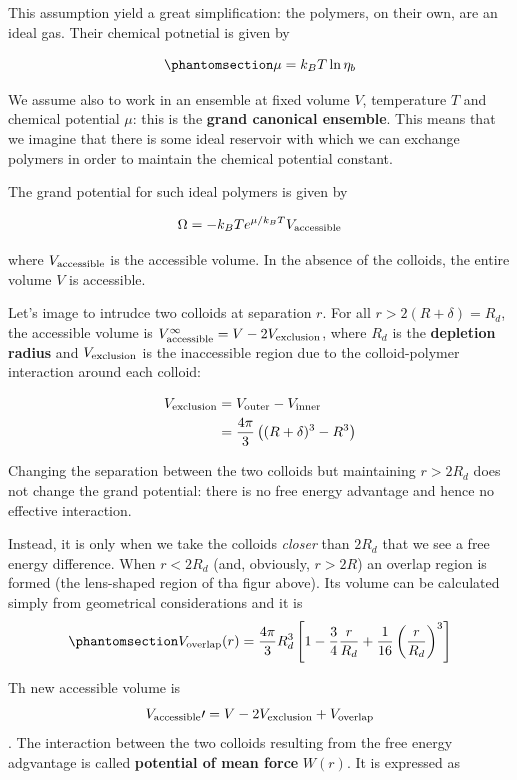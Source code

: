 \documentclass[
  letterpaper,
  enabledeprecatedfontcommands]{report}
\begin{document}
This assumption yield a great simplification: the polymers, on their
own, are an ideal gas. Their chemical potnetial is given by

\begin{equation}\phantomsection\label{eq-ideal-mu}{\mu = k_BT \ln \eta_b}\end{equation}

We assume also to work in an ensemble at fixed volume \(V\), temperature
\(T\) and chemical potential \(\mu\): this is the \textbf{grand
canonical ensemble}. This means that we imagine that there is some ideal
reservoir with which we can exchange polymers in order to maintain the
chemical potential constant.

The grand potential for such ideal polymers is given by

\[\Omega = -k_BT e^{\mu/k_B T}V_{\rm accessible}\]

where \(V_{\rm accessible}\) is the accessible volume. In the absence of
the colloids, the entire volume \(V\) is accessible.

Let's image to intrudce two colloids at separation \(r\). For all
\(r> 2(R+\delta)=R_d\), the accessible volume is
\(V_{\rm accessible}^{\infty}=V-2V_{\rm exclusion}\), where \(R_d\) is
the \textbf{depletion radius} and \(V_{\rm exclusion}\) is the
inaccessible region due to the colloid-polymer interaction around each
colloid:

\[\begin{aligned}
V_{\rm exclusion}& = V_{\rm outer}-V_{\rm inner}\\
&= \dfrac{4\pi}{3}\left((R+\delta)^3-R^3\right)
\end{aligned}
\]

Changing the separation between the two colloids but maintaining
\(r>2R_d\) does not change the grand potential: there is no free energy
advantage and hence no effective interaction.

Instead, it is only when we take the colloids \emph{closer} than
\(2R_d\) that we see a free energy difference. When \(r<2R_d\) (and,
obviously, \(r>2R\)) an overlap region is formed (the lens-shaped region
of tha figur above). Its volume can be calculated simply from
geometrical considerations and it is
\begin{equation}\phantomsection\label{eq-voverlap}{
V_{\mathrm{overlap}}(r)=\dfrac{4 \pi}{3} R_d^3\left[1-\frac{3}{4} \frac{r}{R_d}+\frac{1}{16}\left(\frac{r}{R_d}\right)^3\right]
}\end{equation}

Th new accessible volume is
\[V_{\rm accessible}\prime=V-2V_{\rm exclusion}+V_{\mathrm{overlap}}\].
The interaction between the two colloids resulting from the free energy
adgvantage is called \textbf{potential of mean force} \(W(r)\). It is
expressed as
\end{document}

